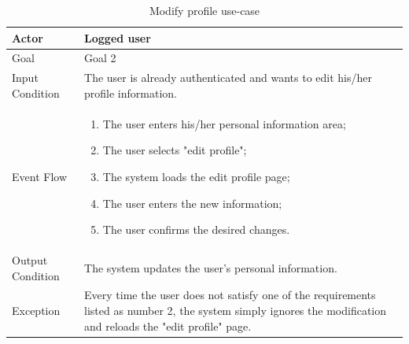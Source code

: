 \begin{table}[H]
\begin{center}
\begin{tabular}{p{} | p{}}
\hline
Actor & Logged user\\
\hline
Goal & Goal 2\\
\hline
Input Condition & The user is already authenticated and wants to edit his/her profile information.\\
\hline
Event Flow & 
\begin{enumerate}
\item The user enters his/her personal information area;
\item The user selects "edit profile";
\item The system loads the edit profile page;
\item The user enters the new information;
\item The user confirms the desired changes.
\end{enumerate} \\
\hline
Output Condition & The system updates the user's personal information.\\
\hline
Exception & Every time the user does not satisfy one of the requirements listed as number 2, the system simply ignores the modification and reloads the "edit profile" page.\\
\hline
\end{tabular}
\end{center}
\caption{Modify profile use-case}
\label{modify_profile_uc}
\end{table}

